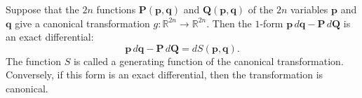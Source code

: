 Suppose that the $2n$ functions $\mathbf{P}(\mathbf{p}, \mathbf{q})$ and $\mathbf{Q}(\mathbf{p}, \mathbf{q})$ of the $2n$ variables $\mathbf{p}$ and $\mathbf{q}$ give a canonical transformation $g: \mathbb{R}^{2n} \to \mathbb{R}^{2n}$. Then the $1$-form $\mathbf{p} \, d\mathbf{q} - \mathbf{P} \, d\mathbf{Q}$ is an exact differential:
$$\mathbf{p} \, d\mathbf{q} - \mathbf{P} \, d\mathbf{Q} = dS(\mathbf{p}, \mathbf{q}).$$
The function $S$ is called a generating function of the canonical transformation. Conversely, if this form is an exact differential, then the transformation is canonical.

